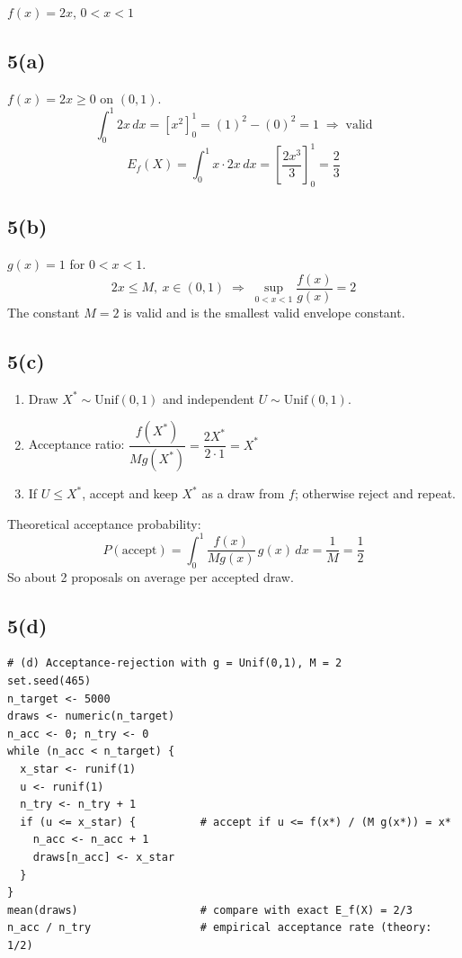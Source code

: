 \documentclass[11pt]{article}
\begin{document}
$f(x) = 2x$, \quad $0 < x < 1$

\subsection*{5(a)}
$f(x) = 2x \geq 0$ on $(0,1)$.
\[
\int_0^1 2x\,dx = \left[x^2\right]_0^1 = (1)^2 - (0)^2 = 1 \;\Rightarrow\; \text{valid}
\]
\[
E_f(X) = \int_0^1 x\cdot 2x\,dx = \left[\frac{2x^3}{3}\right]_0^1 = \frac{2}{3}
\]

\subsection*{5(b)}
$g(x) = 1$ for $0 < x < 1$.
\[
2x \leq M,\ x\in(0,1) \;\Rightarrow\; \sup_{0<x<1}\frac{f(x)}{g(x)} = 2
\]
The constant $M = 2$ is valid and is the smallest valid envelope constant.

\subsection*{5(c)}
\begin{enumerate}
  \item Draw $X^* \sim \text{Unif}(0,1)$ and independent $U \sim \text{Unif}(0,1)$.
  \item Acceptance ratio: $\dfrac{f(X^*)}{Mg(X^*)} = \dfrac{2X^*}{2\cdot 1} = X^*$
  \item If $U \leq X^*$, accept and keep $X^*$ as a draw from $f$; otherwise reject and repeat.
\end{enumerate}
Theoretical acceptance probability:
\[
P(\text{accept}) = \int_0^1 \frac{f(x)}{Mg(x)}\,g(x)\,dx = \frac{1}{M} = \frac{1}{2}
\]
So about 2 proposals on average per accepted draw.

\subsection*{5(d)}

\begin{verbatim}
# (d) Acceptance-rejection with g = Unif(0,1), M = 2
set.seed(465)
n_target <- 5000
draws <- numeric(n_target)
n_acc <- 0; n_try <- 0
while (n_acc < n_target) {
  x_star <- runif(1)
  u <- runif(1)
  n_try <- n_try + 1
  if (u <= x_star) {          # accept if u <= f(x*) / (M g(x*)) = x*
    n_acc <- n_acc + 1
    draws[n_acc] <- x_star
  }
}
mean(draws)                   # compare with exact E_f(X) = 2/3
n_acc / n_try                 # empirical acceptance rate (theory: 1/2)
\end{verbatim}
\end{document}
